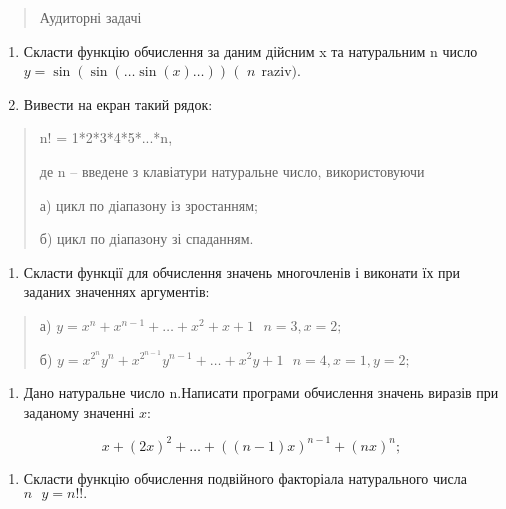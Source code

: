 \documentclass[]{article}
\begin{document}
\begin{quote}
Аудиторні задачі
\end{quote}

\begin{enumerate}
\def\labelenumi{\arabic{enumi})}
\item
  Скласти функцію обчислення за даним дійсним x та натуральним n число
  \(y = \sin(\sin(\ldots\sin(x)\ldots))\) \((\)
  \(\mathrm{\ }n\mathrm{\ \ raziv}).\)
\item
  Вивести на екран такий рядок:
\end{enumerate}

\begin{quote}
n! = 1*2*3*4*5*...*n,

де n -- введене з клавіатури натуральне число, використовуючи

а) цикл по діапазону із зростанням;

б) цикл по діапазону зі спаданням.
\end{quote}

\begin{enumerate}
\def\labelenumi{\arabic{enumi})}
\item
  Скласти функції для обчислення значень многочленів і виконати їх при
  заданих значеннях аргументів:
\end{enumerate}

\begin{quote}
а)
\(y = x^{n} + x^{n - 1} + \ldots + x^{2} + x + 1\mathrm{\text{\ \ \ \ \ \ \ \ \ \ \ \ \ \ \ \ \ \ \ \ }}n = 3,x = 2;\)

б)
\(y = x^{2^{n}}y^{n} + x^{2^{n - 1}}y^{n - 1} + \ldots + x^{2}y + 1\mathrm{\text{\ \ \ \ \ \ \ \ \ \ }}n = 4,x = 1,y = 2;\)
\end{quote}

\begin{enumerate}
\def\labelenumi{\arabic{enumi})}
\item
  Дано натуральне число \(\text{n.}\)Написати програми обчислення
  значень виразів при заданому значенні \(x\):
\end{enumerate}

\[x + (2x)^{2} + \ldots + ((n - 1)x)^{n - 1} + (nx)^{n};\]

\begin{enumerate}
\def\labelenumi{\arabic{enumi})}
\item
  Скласти функцію обчислення подвійного факторіала натурального числа
  \(n\mathrm{\text{\ \ }}y = n!!.\)
\end{enumerate}
\end{document}
